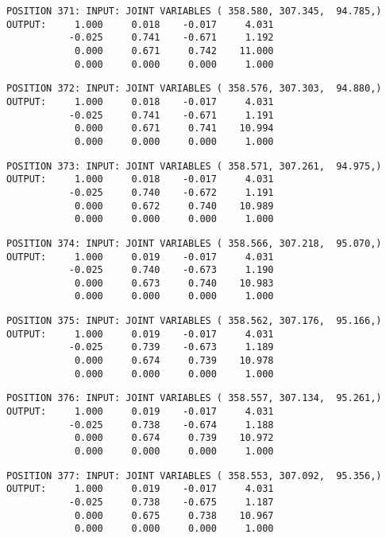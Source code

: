\begin{verbatim}
POSITION 371: INPUT: JOINT VARIABLES ( 358.580, 307.345,  94.785,)
OUTPUT:     1.000     0.018    -0.017     4.031
           -0.025     0.741    -0.671     1.192
            0.000     0.671     0.742    11.000
            0.000     0.000     0.000     1.000
\end{verbatim} \pagebreak[1]\begin{verbatim}
POSITION 372: INPUT: JOINT VARIABLES ( 358.576, 307.303,  94.880,)
OUTPUT:     1.000     0.018    -0.017     4.031
           -0.025     0.741    -0.671     1.191
            0.000     0.671     0.741    10.994
            0.000     0.000     0.000     1.000
\end{verbatim} \pagebreak[1]\begin{verbatim}
POSITION 373: INPUT: JOINT VARIABLES ( 358.571, 307.261,  94.975,)
OUTPUT:     1.000     0.018    -0.017     4.031
           -0.025     0.740    -0.672     1.191
            0.000     0.672     0.740    10.989
            0.000     0.000     0.000     1.000
\end{verbatim} \pagebreak[1]\begin{verbatim}
POSITION 374: INPUT: JOINT VARIABLES ( 358.566, 307.218,  95.070,)
OUTPUT:     1.000     0.019    -0.017     4.031
           -0.025     0.740    -0.673     1.190
            0.000     0.673     0.740    10.983
            0.000     0.000     0.000     1.000
\end{verbatim} \pagebreak[1]\begin{verbatim}
POSITION 375: INPUT: JOINT VARIABLES ( 358.562, 307.176,  95.166,)
OUTPUT:     1.000     0.019    -0.017     4.031
           -0.025     0.739    -0.673     1.189
            0.000     0.674     0.739    10.978
            0.000     0.000     0.000     1.000
\end{verbatim} \pagebreak[1]\begin{verbatim}
POSITION 376: INPUT: JOINT VARIABLES ( 358.557, 307.134,  95.261,)
OUTPUT:     1.000     0.019    -0.017     4.031
           -0.025     0.738    -0.674     1.188
            0.000     0.674     0.739    10.972
            0.000     0.000     0.000     1.000
\end{verbatim} \pagebreak[1]\begin{verbatim}
POSITION 377: INPUT: JOINT VARIABLES ( 358.553, 307.092,  95.356,)
OUTPUT:     1.000     0.019    -0.017     4.031
           -0.025     0.738    -0.675     1.187
            0.000     0.675     0.738    10.967
            0.000     0.000     0.000     1.000
\end{verbatim} \pagebreak[1]\begin{verbatim}

\end{verbatim}

